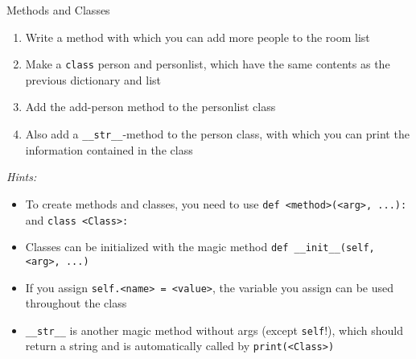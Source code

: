 \documentclass[10pt, aspectratio=169]{beamer}
\begin{document}
\begin{frame}{Methods and Classes}
  \begin{enumerate}
  \item
    Write a method with which you can add more people to the room list
  \item
    Make a \texttt{class} person and personlist, which have the same contents as the previous dictionary and list
  \item
    Add the add-person method to the personlist class
  \item
    Also add a \texttt{\_\_str\_\_}-method to the person class, with which you can print the information contained in the class
  \end{enumerate}

  \textit{Hints:}
  \begin{itemize}
  \item
    To create methods and classes, you need to use \texttt{def <method>(<arg>, ...):} and \texttt{class <Class>:}
  \item
    Classes can be initialized with the magic method \texttt{def \_\_init\_\_(self, <arg>, ...)}
  \item
    If you assign \texttt{self.<name> = <value>}, the variable you assign can be used throughout the class
  \item
    \texttt{\_\_str\_\_} is another magic method without args (except \texttt{self}!), which should return a string and is automatically called by \texttt{print(<Class>)}
  \end{itemize}
\end{frame}
\end{document}
